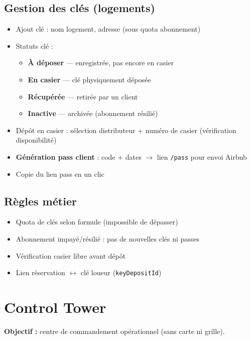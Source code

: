 \documentclass[11pt,a4paper]{article}
\begin{document}
\subsection{Gestion des clés (logements)}
\begin{itemize}
  \item Ajout clé : nom logement, adresse (sous quota abonnement)
  \item Statuts clé :
    \begin{itemize}[noitemsep]
      \item \textbf{À déposer} — enregistrée, pas encore en casier
      \item \textbf{En casier} — clé physiquement déposée
      \item \textbf{Récupérée} — retirée par un client
      \item \textbf{Inactive} — archivée (abonnement résilié)
    \end{itemize}
  \item Dépôt en casier : sélection distributeur + numéro de casier (vérification disponibilité)
  \item \textbf{Génération pass client} : code + dates $\rightarrow$ lien \texttt{/pass} pour envoi Airbnb
  \item Copie du lien pass en un clic
\end{itemize}

\subsection{Règles métier}
\begin{itemize}[noitemsep]
  \item Quota de clés selon formule (impossible de dépasser)
  \item Abonnement impayé/résilié : pas de nouvelles clés ni passes
  \item Vérification casier libre avant dépôt
  \item Lien réservation $\leftrightarrow$ clé loueur (\texttt{keyDepositId})
\end{itemize}

\section{Control Tower}

\textbf{Objectif :} centre de commandement opérationnel (sans carte ni grille).
\end{document}
